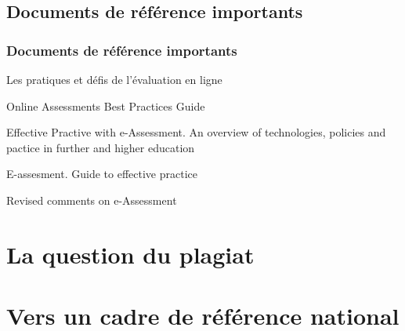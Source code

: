 \documentclass[aspectratio=169]{beamer}
\begin{document}
			\subsection{Documents de référence importants} 
				\begin{frame}[allowframebreaks]
					  \frametitle{Documents de référence importants}
				 		\begin{description}
							\item[Québec] Les pratiques et défis de l'évaluation en ligne \citep{audet2011a}
							\item[États-Unis] Online Assessments Best Practices Guide \citep{NorthCarolina2013}
							\item[Angleterre] Effective Practive with e-Assessment. An overview of technologies, policies and pactice in further and higher education \citep{jisc2007a}
							\item[Écosse] E-assesment. Guide to effective practice \citep{authority2014a}
							\framebreak
							\item[ISO] Revised comments on e-Assessment \citep{ISO2008a}
					\end{description}
				\end{frame}
				
	\section{La question du plagiat} 
		\begin{frame}
		\end{frame}
		
	\section{Vers un cadre de référence national} 
		\begin{frame}
		\end{frame}
		
\end{document}
